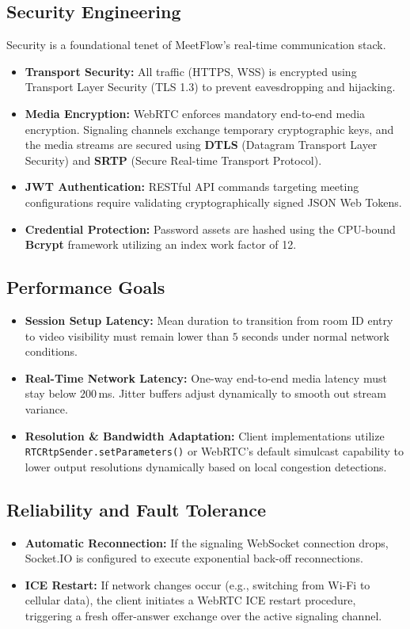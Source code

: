 \documentclass[11pt,a4paper]{article}
\begin{document}
\subsection{Security Engineering}
Security is a foundational tenet of MeetFlow's real-time communication stack.
\begin{itemize}
    \item \textbf{Transport Security:} All traffic (HTTPS, WSS) is encrypted using Transport Layer Security (TLS 1.3) to prevent eavesdropping and hijacking.
    \item \textbf{Media Encryption:} WebRTC enforces mandatory end-to-end media encryption. Signaling channels exchange temporary cryptographic keys, and the media streams are secured using \textbf{DTLS} (Datagram Transport Layer Security) and \textbf{SRTP} (Secure Real-time Transport Protocol).
    \item \textbf{JWT Authentication:} RESTful API commands targeting meeting configurations require validating cryptographically signed JSON Web Tokens.
    \item \textbf{Credential Protection:} Password assets are hashed using the CPU-bound \textbf{Bcrypt} framework utilizing an index work factor of 12.
\end{itemize}

\subsection{Performance Goals}
\begin{itemize}
    \item \textbf{Session Setup Latency:} Mean duration to transition from room ID entry to video visibility must remain lower than $5$ seconds under normal network conditions.
    \item \textbf{Real-Time Network Latency:} One-way end-to-end media latency must stay below $200$\,ms. Jitter buffers adjust dynamically to smooth out stream variance.
    \item \textbf{Resolution \& Bandwidth Adaptation:} Client implementations utilize \texttt{RTCRtpSender.setParameters()} or WebRTC's default simulcast capability to lower output resolutions dynamically based on local congestion detections.
\end{itemize}

\subsection{Reliability and Fault Tolerance}
\begin{itemize}
    \item \textbf{Automatic Reconnection:} If the signaling WebSocket connection drops, Socket.IO is configured to execute exponential back-off reconnections.
    \item \textbf{ICE Restart:} If network changes occur (e.g., switching from Wi-Fi to cellular data), the client initiates a WebRTC ICE restart procedure, triggering a fresh offer-answer exchange over the active signaling channel.
\end{itemize}
\end{document}

